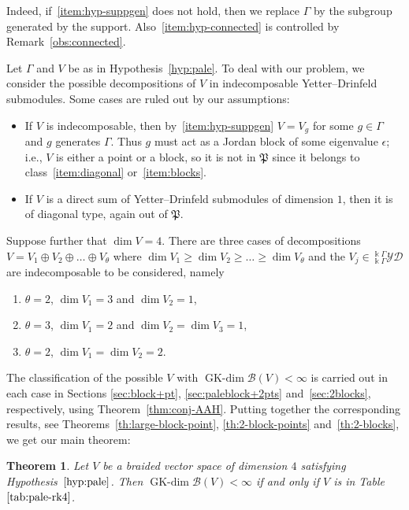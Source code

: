 \documentclass[pdftex]{sigma}
\numberwithin{equation}{section}
\newtheorem{Theorem}{Theorem}[section]
\newcommand{\GK}{\operatorname{GK-dim}}
\newcommand{\toba}{\mathscr B}
\newcommand{\pale}{\mathfrak{P}}
\newcommand{\yd}[1]{{}_{#1}^{#1}\mathcal{YD}}
\begin{document}
Indeed, if~\ref{item:hyp-suppgen} does not hold, then
we replace $\Gamma$ by the subgroup generated by the support.
Also~\ref{item:hyp-connected} is controlled by Remark~\ref{obs:connected}.

Let $\Gamma$ and $V$ be as in
Hypothesis~\ref{hyp:pale}. To deal with our problem,
we consider the possible decompositions of $V$ in indecomposable Yetter--Drinfeld submodules.
Some cases are ruled out by our assumptions:
\begin{itemize}\itemsep=0pt
\item If $V$ is indecomposable, then by~\ref{item:hyp-suppgen} $V=V_g$ for some $g \in \Gamma$ and $g$ generates $\Gamma$.
Thus $g$ must act as a Jordan block of some eigenvalue $\epsilon$; i.e., $V$ is either a point or a block,
so it is not in $\pale$ since it belongs to class~\ref{item:diagonal} or~\ref{item:blocks}.

\item If $V$ is a direct sum of Yetter--Drinfeld submodules of dimension $1$, then it is of diagonal type, again out of $\pale$.
\end{itemize}

Suppose further that
$\dim V = 4$. There are three cases of decompositions
$V = V_1 \oplus V_2 \oplus \dots \oplus V_{\theta}$
where $\dim V_1 \geq \dim V_2 \geq \dots \geq \dim V_{\theta}$ and the $V_j\in \yd{\Bbbk\Gamma}$ are indecomposable to be considered,
namely
\begin{enumerate}[label=$(\arabic*)$]\itemsep=0pt
\item $\theta = 2$, $\dim V_1 = 3$ and $\dim V_2 = 1$,

\item $\theta = 3$, $\dim V_1 = 2$ and $\dim V_2 = \dim V_3 = 1$,

\item $\theta = 2$, $\dim V_1 = \dim V_2 = 2$.
\end{enumerate}


The classification of the possible $V$ with $\GK \toba(V) < \infty$ is carried out in each case in Sections
\ref{sec:block+pt}, \ref{sec:paleblock+2pts} and~\ref{sec:2blocks}, respectively, using Theorem~\ref{thm:conj-AAH}.
Putting together
the corresponding results, see Theorems~\ref{th:large-block-point}, \ref{th:2-block-points} and~\ref{th:2-blocks},
we get our main theorem:

\begin{Theorem}\label{th:paleblock-dim4}
Let $V$ be a braided vector space of dimension $4$ satisfying Hypothesis~$\ref{hyp:pale}$.
Then $\GK \toba(V) < \infty$ if and only if $V$ is in Table~$\ref{tab:pale-rk4}$.
\end{Theorem}
\end{document}
